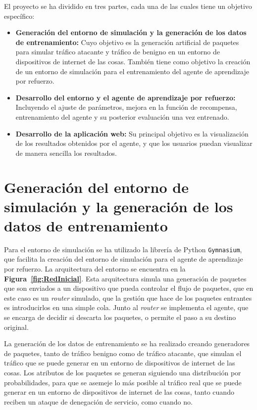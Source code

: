 
El proyecto se ha dividido en tres partes, cada una de las cuales tiene un objetivo específico:
\begin{itemize}
    \item \textbf{Generación del entorno de simulación y la generación de los datos de entrenamiento:} Cuyo objetivo es la generación artificial de paquetes para simular tráfico atacante y tráfico de benigno en un entorno de dispositivos de internet de las cosas. También tiene como objetivo la creación de un entorno de simulación para el entrenamiento del agente de aprendizaje por refuerzo.
    \item \textbf{Desarrollo del entorno y el agente de aprendizaje por refuerzo:} Incluyendo el ajuste de parámetros, mejora en la función de recompensa, entrenamiento del agente y su posterior evaluación una vez entrenado.
    \item \textbf{Desarrollo de la aplicación web:} Su principal objetivo es la visualización de los resultados obtenidos por el agente, y que los usuarios puedan visualizar de manera sencilla los resultados.
\end{itemize}

\section{Generación del entorno de simulación y la generación de los datos de entrenamiento}
Para el entorno de simulación se ha utilizado la librería de Python \texttt{Gymnasium}, que facilita la creación del entorno de simulación para el agente de aprendizaje por refuerzo.
La arquitectura del entorno se encuentra en la \textbf{Figura~\ref{fig:RedInicial}}. Esta arquitectura simula una generación de paquetes que son enviados a un dispositivo que pueda controlar el flujo de paquetes, que en este caso es un \textit{router} simulado, que la gestión que hace de los paquetes entrantes es introducirlos en una simple cola. Junto al \textit{router} se implementa el agente, que se encarga de decidir si descarta los paquetes, o permite el paso a su destino original.

La generación de los datos de entrenamiento se ha realizado creando generadores de paquetes, tanto de tráfico benigno como de tráfico atacante, que simulan el tráfico que se puede generar en un entorno de dispositivos de internet de las cosas. Los atributos de los paquetes se generan siguiendo una distribución por probabilidades, para que se asemeje lo más posible al tráfico real que se puede generar en un entorno de dispositivos de internet de las cosas, tanto cuando reciben un ataque de denegación de servicio, como cuando no.


